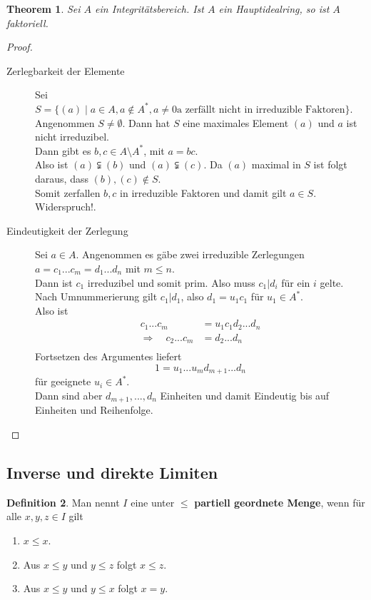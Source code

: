 \documentclass[10pt,a4paper]{article}
\theoremstyle{plain}
\newtheorem{theorem}{Theorem}[section]
\theoremstyle{definition}
\newtheorem{definition}[theorem]{Definition}
\theoremstyle{remark}
\begin{document}
	\begin{theorem}
		Sei $A$ ein Integritätsbereich. Ist $A$ ein Hauptidealring, so ist $A$ faktoriell.
	\end{theorem}
	\begin{proof}
		\begin{description}
			\item[Zerlegbarkeit der Elemente] Sei $S=\{(a)\mid a\in A,a\notin A^*,a\neq 0\text{a zerfällt nicht in irreduzible Faktoren}\}$.\\
			Angenommen $S\neq\emptyset$. Dann hat $S$ eine maximales Element $(a)$ und $a$ ist nicht irreduzibel.\\
			Dann gibt es $b,c\in A\setminus A^*$, mit $a=bc$.\\
			Also ist $(a)\subsetneqq (b)$ und $(a)\subsetneqq (c)$. Da $(a)$ maximal in $S$ ist folgt daraus, dass $(b),(c)\notin S$.\\
			Somit zerfallen $b,c$ in irreduzible Faktoren und damit gilt $a\in S$. Widerspruch!.
			\item[Eindeutigkeit der Zerlegung] Sei $a\in A$. Angenommen es gäbe zwei irreduzible Zerlegungen $a=c_1...c_m=d_1...d_n$ mit $m\leq n$.\\
			Dann ist $c_1$ irreduzibel und somit prim. Also muss $c_1|d_i$ für ein $i$ gelte.\\
			Nach Umnummerierung gilt $c_1|d_1$, also $d_1=u_1c_1$ für $u_1\in A^*$.\\
			Also ist
			\begin{align*}
			c_1...c_m&=u_1c_1d_2...d_n\\
			\Rightarrow\quad c_2...c_m&=d_2...d_n\\
			\end{align*}
			Fortsetzen des Argumentes liefert
			\[1=u_1...u_md_{m+1}...d_n\]
			für geeignete $u_i\in A^*$.\\
			Dann sind aber $d_{m+1},...,d_n$ Einheiten und damit Eindeutig bis auf Einheiten und Reihenfolge.
		\end{description}
	\end{proof}

\subsection{Inverse und direkte Limiten}

	\begin{definition}
		Man nennt $I$ eine unter $\leq$ \textbf{partiell geordnete Menge}, wenn für alle $x,y,z\in I$ gilt
		\begin{enumerate}
			\item $x\leq x$.
			\item Aus $x\leq y$ und $y\leq z$ folgt $x\leq z$.
			\item Aus $x\leq y$ und $y\leq x$ folgt $x=y$.
		\end{enumerate}
	\end{definition}
\end{document}
